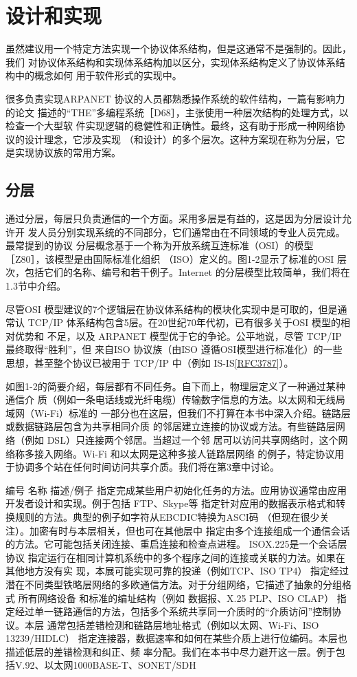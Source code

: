 \section{设计和实现}
虽然建议用一个特定方法实现一个协议体系结构，但是这通常不是强制的。因此，我们
对协议体系结构和实现体系结构加以区分，实现体系结构定义了协议体系结构中的概念如何
用于软件形式的实现中。

很多负责实现ARPANET 协议的人员都熟悉操作系统的软件结构，一篇有影响力的论文
描述的“THE”多编程系统［D68］，主张使用一种层次结构的处理方式，以检查一个大型软
件实现逻辑的稳健性和正确性。最终，这有助于形成一种网络协议的设计理念，它涉及实现
（和设计）的多个层次。这种方案现在称为分层，它是实现协议族的常用方案。

\subsection{分层}
通过分层，每层只负责通信的一个方面。采用多层是有益的，这是因为分层设计允许开
发人员分别实现系统的不同部分，它们通常由在不同领域的专业人员完成。最常提到的协议
分层概念基于一个称为开放系统互连标准（OSI）的模型［Z80］，该模型是由国际标准化组织
（ISO）定义的。图1-2显示了标准的OSI 层次，包括它们的名称、编号和若干例子。Internet
的分层模型比较简单，我们将在1.3节中介绍。

尽管OSI 模型建议的7个逻辑层在协议体系结构的模块化实现中是可取的，但是通常认
TCP/IP 体系结构包含5层。在20世纪70年代初，已有很多关于OSI 模型的相对优势和
不足，以及 ARPANET 模型优于它的争论。公平地说，尽管 TCP/IP 最终取得“胜利”，但
来自ISO 协议族（由ISO 遵循OSI模型进行标准化）的一些思想，甚至整个协议已被用于
TCP/IP 中（例如 IS-IS\href{https://www.rfc-editor.org/rfc/rfc3787}{[RFC3787]}）。

如图1-2的简要介绍，每层都有不同任务。自下而上，物理层定义了一种通过某种通信介
质（例如一条电话线或光纤电缆）传输数字信息的方法。以太网和无线局域网（Wi-Fi）标准的
一部分也在这层，但我们不打算在本书中深入介绍。链路层或数据链路层包含为共享相同介质
的邻居建立连接的协议或方法。有些链路层网络（例如 DSL）只连接两个邻居。当超过一个邻
居可以访问共享网络时，这个网络称多接入网络。Wi-Fi 和以太网是这种多接人链路层网络
的例子，特定协议用于协调多个站在任何时间访问共享介质。我们将在第3章中讨论。

编号
名称
描述/例子
指定完成某些用户初始化任务的方法。应用协议通常由应用开发者设计和实现。例于包括
FTP、Skype等
指定针对应用的数据表示格式和转换规则的方法。典型的例子如字符从EBCDIC特换为ASCI码
（但现在很少关注）。加密有时与本层相关，但也可在其他层中
指定由多个连接组成一个通信会话的方法。它可能包括关闭连接、重启连接和检查点进程。
ISOX.225是一个会话层协议
指定运行在相同计算机系统中的多个程序之间的连接或关联的力法。如果在其他地方没有实
现，本展可能实现可靠的投递（例如TCP、ISO TP4）
指定经过潜在不同类型铁略层网络的多欧通信方法。对于分组网络，它描述了抽象的分组格式
所有网络设备
和标准的编址结构（例如 数据报、X.25 PLP、ISO CLAP）
指定经过单一链路通信的方法，包括多个系统共享同一介质时的“介质访问”控制协议。本层
通常包括差错检测和链路层地址格式（例如以太网、Wi-Fi、ISO 13239/HIDLC）
指定连接器，数据速率和如何在某些介质上进行位编码。本层也描述低层的差错检测和纠正、频
率分配。我们在本书中尽力避开这一层。例于包括V.92、以太网1000BASE-T、SONET/SDH

